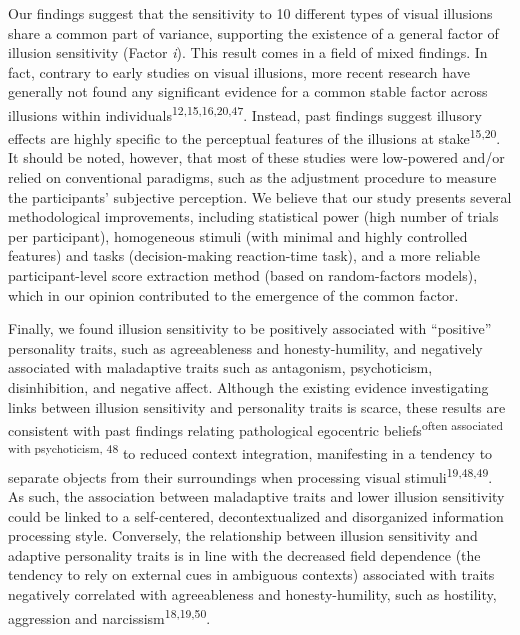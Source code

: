 \documentclass[
  man,floatsintext]{apa6}
\begin{document}
Our findings suggest that the sensitivity to 10 different types of visual illusions share a common part of variance, supporting the existence of a general factor of illusion sensitivity (Factor \emph{i}). This result comes in a field of mixed findings. In fact, contrary to early studies on visual illusions, more recent research have generally not found any significant evidence for a common stable factor across illusions within individuals\textsuperscript{12,15,16,20,47}. Instead, past findings suggest illusory effects are highly specific to the perceptual features of the illusions at stake\textsuperscript{15,20}. It should be noted, however, that most of these studies were low-powered and/or relied on conventional paradigms, such as the adjustment procedure to measure the participants' subjective perception. We believe that our study presents several methodological improvements, including statistical power (high number of trials per participant), homogeneous stimuli (with minimal and highly controlled features) and tasks (decision-making reaction-time task), and a more reliable participant-level score extraction method (based on random-factors models), which in our opinion contributed to the emergence of the common factor.

Finally, we found illusion sensitivity to be positively associated with ``positive'' personality traits, such as agreeableness and honesty-humility, and negatively associated with maladaptive traits such as antagonism, psychoticism, disinhibition, and negative affect. Although the existing evidence investigating links between illusion sensitivity and personality traits is scarce, these results are consistent with past findings relating pathological egocentric beliefs\textsuperscript{often associated with psychoticism, 48} to reduced context integration, manifesting in a tendency to separate objects from their surroundings when processing visual stimuli\textsuperscript{19,48,49}. As such, the association between maladaptive traits and lower illusion sensitivity could be linked to a self-centered, decontextualized and disorganized information processing style. Conversely, the relationship between illusion sensitivity and adaptive personality traits is in line with the decreased field dependence (the tendency to rely on external cues in ambiguous contexts) associated with traits negatively correlated with agreeableness and honesty-humility, such as hostility, aggression and narcissism\textsuperscript{18,19,50}.
\end{document}
